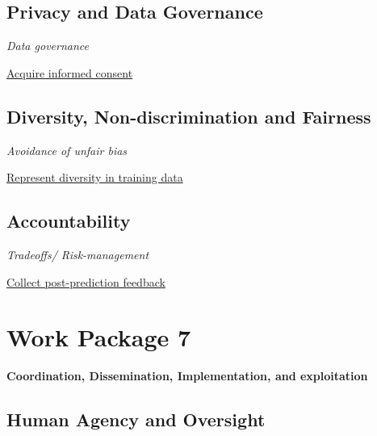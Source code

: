 \documentclass[
  letterpaper,
  DIV=11,
  numbers=noendperiod]{scrreport}
\begin{document}
\hypertarget{privacy-and-data-governance-6}{%
\section*{Privacy and Data
Governance}\label{privacy-and-data-governance-6}}


\emph{Data governance}

\protect\hyperlink{acquire-informed-consent}{Acquire informed consent}

\hypertarget{diversity-non-discrimination-and-fairness-5}{%
\section*{Diversity, Non-discrimination and
Fairness}\label{diversity-non-discrimination-and-fairness-5}}


\emph{Avoidance of unfair bias}

\protect\hyperlink{represent-diversity-in-training-data}{Represent
diversity in training data}

\hypertarget{accountability-4}{%
\section*{Accountability}\label{accountability-4}}


\emph{Tradeoffs/ Risk-management}

\protect\hyperlink{collect-post-prediction-feedback}{Collect
post-prediction feedback}


\hypertarget{work-package-7}{%
\chapter*{Work Package 7}\label{work-package-7}}


\textbf{Coordination, Dissemination, Implementation, and exploitation}

\hypertarget{human-agency-and-oversight-6}{%
\section*{Human Agency and
Oversight}\label{human-agency-and-oversight-6}}
\end{document}
